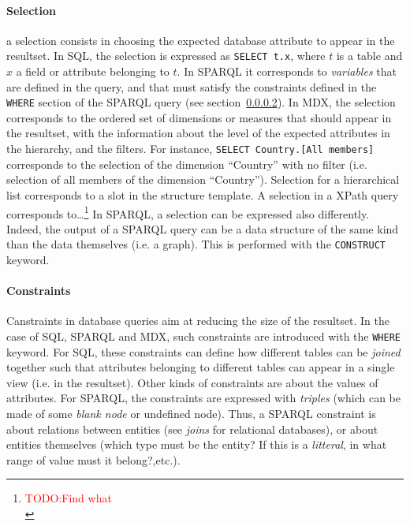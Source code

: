 \documentclass[10pt,journal,letterpaper,compsoc]{IEEEtran}
\newcommand\TODO[1]{{\textcolor{red}{TODO:#1\\}}}
\begin{document}
\paragraph{Selection}
\label{sec:query-languages-selection}
a selection consists in choosing the expected database attribute to appear in
the resultset.
In SQL, the selection is expressed as \verb?SELECT t.x?, where $t$ is a table
and $x$ a field or attribute belonging to $t$. In SPARQL it corresponds to
\emph{variables} that are defined in the query, and that must satisfy the
constraints defined in the \verb?WHERE? section of the SPARQL query (see
section~\ref{sec:query-languages-constraints}).
In MDX, the selection corresponds to the ordered set of dimensions or measures
that should appear in the resultset, with the information about the level of the
expected attributes in the hierarchy, and the filters. For instance,
\verb?SELECT Country.[All members]? corresponds to the selection of the
dimension ``Country'' with no filter (i.e. selection of all members of the
dimension ``Country'').
Selection for a hierarchical list corresponds to a slot in the structure
template.
A selection in a XPath query corresponds to\ldots\footnote{\TODO{Find what}}
In SPARQL, a selection can be expressed also differently. Indeed, the output of
a SPARQL query can be a data structure of the same kind than the data themselves
(i.e. a graph). This is performed with the \verb?CONSTRUCT? keyword.

\paragraph{Constraints}
\label{sec:query-languages-constraints}
Canstraints in database queries aim at reducing the size of the resultset.
In the case of SQL, SPARQL and MDX, such constraints are introduced with the
\verb?WHERE? keyword. For SQL, these constraints can define how different tables
can be \emph{joined} together such that attributes belonging to different tables
can appear in a single view (i.e. in the resultset). Other kinds of constraints
are about the values of attributes.
For SPARQL, the constraints are expressed with \emph{triples} (which can be
made of some \emph{blank node} or undefined node). Thus, a SPARQL constraint is
about relations between entities (see \emph{joins} for relational databases), or
about entities themselves (which type must be the entity? If this is a
\emph{litteral}, in what range of value must it belong?,etc.).
\end{document}
